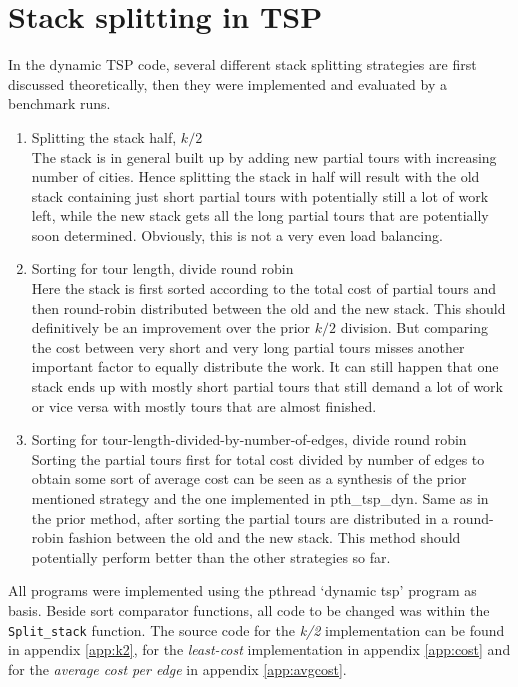 \documentclass[a4paper,11pt,twoside]{article}
\begin{document}
\section{Stack splitting in TSP}
In the dynamic TSP code, several different stack splitting strategies are first discussed theoretically, then they were implemented and evaluated by a benchmark runs.
\begin{enumerate}[label={\alph*)}]
\item Splitting the stack half, $k/2$\\
The stack is in general built up by adding new partial tours with increasing number of cities. Hence splitting the stack in half will result with the old stack containing just short partial tours with potentially still a lot of work left, while the new stack gets all the long partial tours that are potentially soon determined. Obviously, this is not a very even load balancing.
\item Sorting for tour length, divide round robin\\
Here the stack is first sorted according to the total cost of partial tours and then round-robin distributed between the old and the new stack. This should definitively be an improvement over the prior $k/2$ division. But comparing the cost between very short and very long partial tours misses another important factor to equally distribute the work. It can still happen that one stack ends up with mostly short partial tours that still demand a lot of work or vice versa with mostly tours that are almost finished.
\item Sorting for tour-length-divided-by-number-of-edges, divide round robin\\
Sorting the partial tours first for total cost divided by number of edges to obtain some sort of average cost can be seen as a synthesis of the prior mentioned strategy and the one implemented in pth\_tsp\_dyn. Same as in the prior method, after sorting the partial tours are distributed in a round-robin fashion between the old and the new stack. This method should potentially perform better than the other strategies so far. 
\end{enumerate}

All programs were implemented using the pthread `dynamic tsp' program as basis. Beside sort comparator functions, all code to be changed was within the \verb+Split_stack+ function. The source code for the \textit{k/2} implementation can be found in appendix \ref{app:k2}, for the \textit{least-cost} implementation in appendix \ref{app:cost} and for the \textit{average cost per edge} in appendix \ref{app:avgcost}.  
\end{document}
